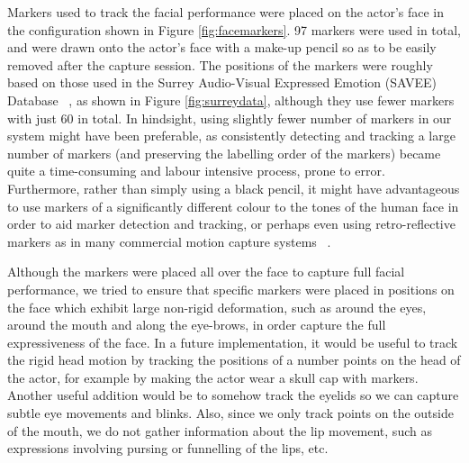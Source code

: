 Markers used to track the facial performance were placed on the actor's face in the configuration shown in Figure \ref{fig:facemarkers}. 97 markers were used in total, and were drawn onto the actor's face with a make-up pencil so as to be easily removed after the capture session. The positions of the markers were roughly based on those used in the Surrey Audio-Visual Expressed Emotion (SAVEE) Database ~\cite{Surrey}, as shown in Figure \ref{fig:surreydata}, although they use fewer markers with just 60 in total. In hindsight, using slightly fewer number of markers in our system might have been preferable, as consistently detecting and tracking a large number of markers (and preserving the labelling order of the markers) became quite a time-consuming and labour intensive process, prone to error. Furthermore, rather than simply using a black pencil, it might have advantageous to use markers of a significantly different colour to the tones of the human face in order to aid marker detection and tracking, or perhaps even using retro-reflective markers as in many commercial motion capture systems ~\cite{Vicon}.

Although the markers were placed all over the face to capture full facial performance, we tried to ensure that specific markers were placed in positions on the face which exhibit large non-rigid deformation, such as around the eyes, around the mouth and along the eye-brows, in order capture the full expressiveness of the face. In a future implementation, it would be useful to track the rigid head motion by tracking the positions of a number points on the head of the actor, for example by making the actor wear a skull cap with markers. Another useful addition would be to somehow track the eyelids so we can capture subtle eye movements and blinks. Also, since we only track points on the outside of the mouth, we do not gather information about the lip movement, such as expressions involving pursing or funnelling of the lips, etc.

